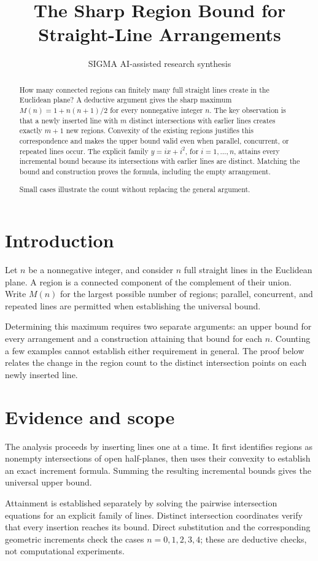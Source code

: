 \documentclass[11pt]{article}
\title{The Sharp Region Bound for Straight-Line Arrangements}
\date{}
\author{SIGMA AI-assisted research synthesis}
\begin{document}
\maketitle

\begin{abstract}
How many connected regions can finitely many full straight lines create in the Euclidean plane? A deductive argument gives the sharp maximum $M(n)=1+n(n+1)/2$ for every nonnegative integer $n$. The key observation is that a newly inserted line with $m$ distinct intersections with earlier lines creates exactly $m+1$ new regions. Convexity of the existing regions justifies this correspondence and makes the upper bound valid even when parallel, concurrent, or repeated lines occur. The explicit family $y=ix+i^2$, for $i=1,\ldots,n$, attains every incremental bound because its intersections with earlier lines are distinct. Matching the bound and construction proves the formula, including the empty arrangement.

Small cases illustrate the count without replacing the general argument.
\end{abstract}
\section{Introduction}
Let $n$ be a nonnegative integer, and consider $n$ full straight lines in the Euclidean plane. A region is a connected component of the complement of their union. Write $M(n)$ for the largest possible number of regions; parallel, concurrent, and repeated lines are permitted when establishing the universal bound.

Determining this maximum requires two separate arguments: an upper bound for every arrangement and a construction attaining that bound for each $n$. Counting a few examples cannot establish either requirement in general. The proof below relates the change in the region count to the distinct intersection points on each newly inserted line.

\section{Evidence and scope}
The analysis proceeds by inserting lines one at a time. It first identifies regions as nonempty intersections of open half-planes, then uses their convexity to establish an exact increment formula. Summing the resulting incremental bounds gives the universal upper bound.

Attainment is established separately by solving the pairwise intersection equations for an explicit family of lines. Distinct intersection coordinates verify that every insertion reaches its bound. Direct substitution and the corresponding geometric increments check the cases $n=0,1,2,3,4$; these are deductive checks, not computational experiments.
\end{document}

